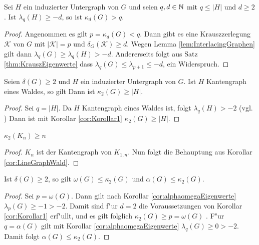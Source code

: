 \begin{corollary}
  \label{cor:Korollar1}
  Sei $H$ ein induzierter Untergraph von $G$ und seien $q,d \in {\mathbb{N}}$ mit $q \leq |H|$ und $d \geq 2$.
  Ist $\lambda_{q}(H) \geq -d$, so ist $\kappa_{d}(G) > q$.
\end{corollary}
\begin{proof}
  Angenommen es gilt $p = \kappa_{d}(G) < q$. Dann gibt es  eine Krauszzerlegung $\mathcal{K}$ von $G$ mit $|\mathcal{K}| = p$ und $\delta_G(\mathcal{K}) \geq d$. Wegen Lemma \ref{lem:InterlacingGraphen} gilt dann $\lambda_{q}(G) \geq \lambda_{q}(H) > -d $. Andererseits folgt aus Satz \ref{thm:KrauszEigenwerte} dass $\lambda_{q}(G) \leq \lambda_{p+1} \leq -d $, ein Widerspruch. 
\end{proof}

\begin{corollary}
  \label{cor:LineGraphWald}
  Seien $\delta(G) \geq 2$ und $H$ ein induzierter Untergraph von $G$. Ist $H$ Kantengraph eines Waldes, so gilt 
  Dann ist $\kappa_{2}(G)\geq \left|H\right|$.
\end{corollary}

\begin{proof}
  Sei $q = |H|$. Da $H$ Kantengraph eines Waldes ist, folgt $\lambda_{q}(H) > -2$ (vgl. \cite[3.4.10]{zbMATH05625877}) 
  Dann ist mit Korollar \ref{cor:Korollar1} $\kappa_{2}\left( G \right) \geq \left| H\right|$.
\end{proof}

\begin{corollary}[Klotz]
  $\kappa_{2}\left( K_n \right) \geq n$
\end{corollary}

\begin{proof}
  $K_n$ ist der Kantengraph von $K_{1,n}$. Nun folgt die Behauptung aus Korollar \ref{cor:LineGraphWald}.
\end{proof}
\begin{corollary}
  Ist $\delta\left( G \right) \geq 2$, so gilt $\omega\left( G \right)\leq \kappa_{2}\left( G \right)$ und $\alpha\left( G \right)\leq \kappa_{2}\left( G \right)$.
  \label{cor:alphaomegakrausz}
\end{corollary}

\begin{proof}
  Sei $p = \omega(G)$. Dann gilt nach Korollar \ref{cor:alphaomegaEigenwerte} $\lambda_{p}\left( G \right)\geq -1 > -2$. Damit sind f"ur $d=2$ die Voraussetzungen von Korollar \ref{cor:Korollar1} erf"ullt, und es gilt folglich $\kappa_{2}\left( G \right)\geq p = \omega\left( G \right)$ .
  F"ur $q=\alpha\left( G \right)$ gilt mit Korollar \ref{cor:alphaomegaEigenwerte} $\lambda_{q}\left( G \right)\geq 0 > -2$. Damit folgt $\alpha\left( G \right) \leq \kappa_{2}\left( G \right)$.
\end{proof}

